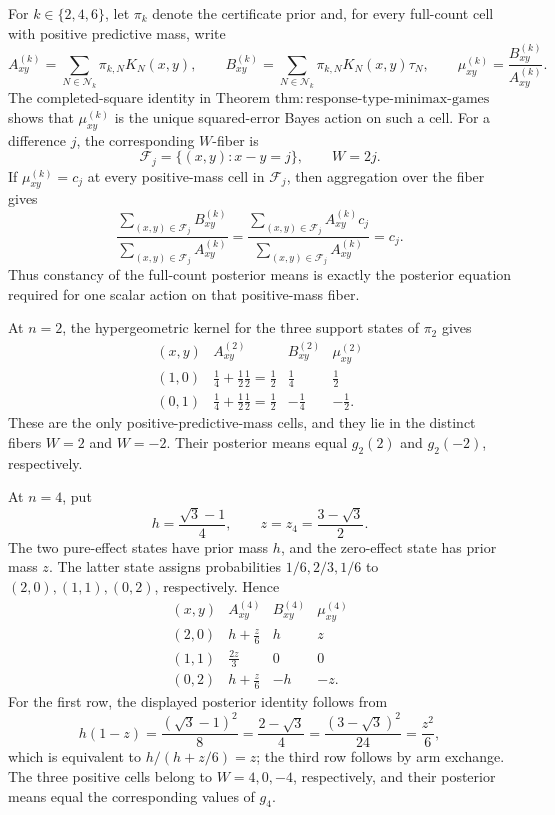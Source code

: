 For \(k\in\{2,4,6\}\), let \(\pi_k\) denote the certificate prior and, for every full-count cell with positive predictive mass, write
\[
 A_{xy}^{(k)}=\sum_{N\in\mathcal N_k}\pi_{k,N}K_N(x,y),
 \qquad
 B_{xy}^{(k)}=\sum_{N\in\mathcal N_k}\pi_{k,N}K_N(x,y)\tau_N,
 \qquad
 \mu_{xy}^{(k)}=\frac{B_{xy}^{(k)}}{A_{xy}^{(k)}}.
\]
The completed-square identity in Theorem
\(\mathrm{thm{:}response\mbox{-}type\mbox{-}minimax\mbox{-}games}\)
shows that \(\mu_{xy}^{(k)}\) is the unique squared-error Bayes action on such a cell.  For a difference \(j\), the corresponding \(W\)-fiber is
\[
 \mathcal F_j=\{(x,y):x-y=j\},\qquad W=2j.
\]
If \(\mu_{xy}^{(k)}=c_j\) at every positive-mass cell in \(\mathcal F_j\), then aggregation over the fiber gives
\[
 \frac{\sum_{(x,y)\in\mathcal F_j}B_{xy}^{(k)}}
 {\sum_{(x,y)\in\mathcal F_j}A_{xy}^{(k)}}
 =
 \frac{\sum_{(x,y)\in\mathcal F_j}A_{xy}^{(k)}c_j}
 {\sum_{(x,y)\in\mathcal F_j}A_{xy}^{(k)}}
 =c_j.
\]
Thus constancy of the full-count posterior means is exactly the posterior equation required for one scalar action on that positive-mass fiber.

At \(n=2\), the hypergeometric kernel for the three support states of \(\pi_2\) gives
\[
\begin{array}{c|ccc}
(x,y)&A_{xy}^{(2)}&B_{xy}^{(2)}&\mu_{xy}^{(2)}\\ \hline
(1,0)&\frac14+\frac12\frac12=\frac12&\frac14&\frac12\\[2pt]
(0,1)&\frac14+\frac12\frac12=\frac12&-\frac14&-\frac12 .
\end{array}
\]
These are the only positive-predictive-mass cells, and they lie in the distinct fibers \(W=2\) and \(W=-2\).  Their posterior means equal \(g_2(2)\) and \(g_2(-2)\), respectively.

At \(n=4\), put
\[
 h=\frac{\sqrt3-1}{4},
 \qquad
 z=z_4=\frac{3-\sqrt3}{2}.
\]
The two pure-effect states have prior mass \(h\), and the zero-effect state has prior mass \(z\).  The latter state assigns probabilities \(1/6,2/3,1/6\) to \((2,0),(1,1),(0,2)\), respectively.  Hence
\[
\begin{array}{c|ccc}
(x,y)&A_{xy}^{(4)}&B_{xy}^{(4)}&\mu_{xy}^{(4)}\\ \hline
(2,0)&h+\frac z6&h&z\\[2pt]
(1,1)&\frac{2z}{3}&0&0\\[2pt]
(0,2)&h+\frac z6&-h&-z .
\end{array}
\]
For the first row, the displayed posterior identity follows from
\[
 h(1-z)=\frac{(\sqrt3-1)^2}{8}
 =\frac{2-\sqrt3}{4}
 =\frac{(3-\sqrt3)^2}{24}
 =\frac{z^2}{6},
\]
which is equivalent to \(h/(h+z/6)=z\); the third row follows by arm exchange.  The three positive cells belong to \(W=4,0,-4\), respectively, and their posterior means equal the corresponding values of \(g_4\).

